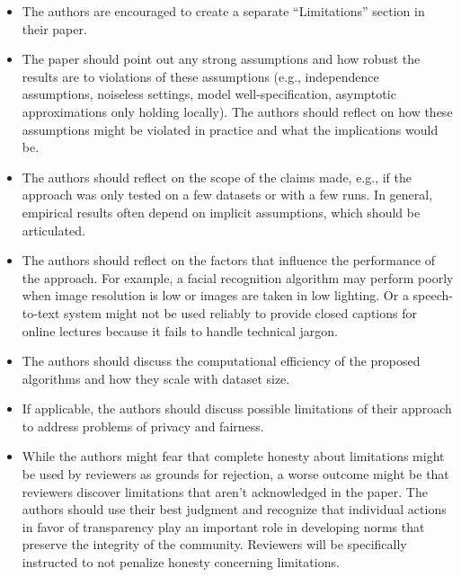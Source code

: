 \begin{enumerate}
\begin{itemize}
        \item The authors are encouraged to create a separate ``Limitations'' section in their paper.
        \item The paper should point out any strong assumptions and how robust the results are to violations of these assumptions (e.g., independence assumptions, noiseless settings, model well-specification, asymptotic approximations only holding locally). The authors should reflect on how these assumptions might be violated in practice and what the implications would be.
        \item The authors should reflect on the scope of the claims made, e.g., if the approach was only tested on a few datasets or with a few runs. In general, empirical results often depend on implicit assumptions, which should be articulated.
        \item The authors should reflect on the factors that influence the performance of the approach. For example, a facial recognition algorithm may perform poorly when image resolution is low or images are taken in low lighting. Or a speech-to-text system might not be used reliably to provide closed captions for online lectures because it fails to handle technical jargon.
        \item The authors should discuss the computational efficiency of the proposed algorithms and how they scale with dataset size.
        \item If applicable, the authors should discuss possible limitations of their approach to address problems of privacy and fairness.
        \item While the authors might fear that complete honesty about limitations might be used by reviewers as grounds for rejection, a worse outcome might be that reviewers discover limitations that aren't acknowledged in the paper. The authors should use their best judgment and recognize that individual actions in favor of transparency play an important role in developing norms that preserve the integrity of the community. Reviewers will be specifically instructed to not penalize honesty concerning limitations.
    \end{itemize}


\end{enumerate}
